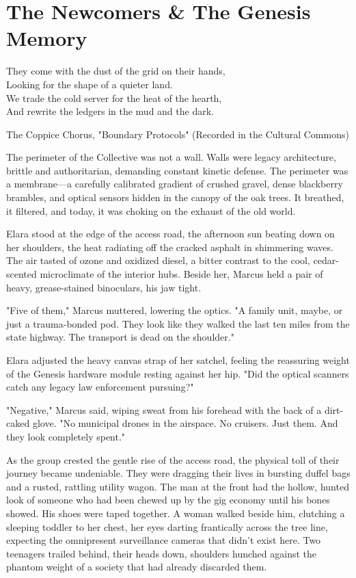 \chapter{The Newcomers & The Genesis Memory}

\epigraph{They come with the dust of the grid on their hands, \\
Looking for the shape of a quieter land. \\
We trade the cold server for the heat of the hearth, \\
And rewrite the ledgers in the mud and the dark.}{The Coppice Chorus, "Boundary Protocols" (Recorded in the Cultural Commons)}

The perimeter of the Collective was not a wall. Walls were legacy architecture, brittle and authoritarian, demanding constant kinetic defense. The perimeter was a membrane—a carefully calibrated gradient of crushed gravel, dense blackberry brambles, and optical sensors hidden in the canopy of the oak trees. It breathed, it filtered, and today, it was choking on the exhaust of the old world.

Elara stood at the edge of the access road, the afternoon sun beating down on her shoulders, the heat radiating off the cracked asphalt in shimmering waves. The air tasted of ozone and oxidized diesel, a bitter contrast to the cool, cedar-scented microclimate of the interior hubs. Beside her, Marcus held a pair of heavy, grease-stained binoculars, his jaw tight. 

"Five of them," Marcus muttered, lowering the optics. "A family unit, maybe, or just a trauma-bonded pod. They look like they walked the last ten miles from the state highway. The transport is dead on the shoulder."

Elara adjusted the heavy canvas strap of her satchel, feeling the reassuring weight of the Genesis hardware module resting against her hip. "Did the optical scanners catch any legacy law enforcement pursuing?"

"Negative," Marcus said, wiping sweat from his forehead with the back of a dirt-caked glove. "No municipal drones in the airspace. No cruisers. Just them. And they look completely spent."

As the group crested the gentle rise of the access road, the physical toll of their journey became undeniable. They were dragging their lives in bursting duffel bags and a rusted, rattling utility wagon. The man at the front had the hollow, hunted look of someone who had been chewed up by the gig economy until his bones showed. His shoes were taped together. A woman walked beside him, clutching a sleeping toddler to her chest, her eyes darting frantically across the tree line, expecting the omnipresent surveillance cameras that didn't exist here. Two teenagers trailed behind, their heads down, shoulders hunched against the phantom weight of a society that had already discarded them.


